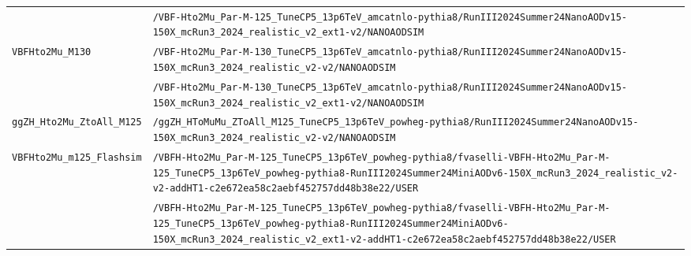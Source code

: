 \begin{longtable}{@{}>{\RaggedRight\arraybackslash}p{} >{\RaggedRight\arraybackslash}p{}@{}}
 & \texttt{/\allowbreak{}VBF-\allowbreak{}Hto2Mu\_\allowbreak{}Par-\allowbreak{}M-\allowbreak{}125\_\allowbreak{}TuneCP5\_\allowbreak{}13p6TeV\_\allowbreak{}amcatnlo-\allowbreak{}pythia8/\allowbreak{}RunIII2024Summer24NanoAODv15-\allowbreak{}150X\_\allowbreak{}mcRun3\_\allowbreak{}2024\_\allowbreak{}realistic\_\allowbreak{}v2\_\allowbreak{}ext1-\allowbreak{}v2/\allowbreak{}NANOAODSIM} \\
\addlinespace[2pt]
\texttt{VBFHto2Mu\_\allowbreak{}M130} & \texttt{/\allowbreak{}VBF-\allowbreak{}Hto2Mu\_\allowbreak{}Par-\allowbreak{}M-\allowbreak{}130\_\allowbreak{}TuneCP5\_\allowbreak{}13p6TeV\_\allowbreak{}amcatnlo-\allowbreak{}pythia8/\allowbreak{}RunIII2024Summer24NanoAODv15-\allowbreak{}150X\_\allowbreak{}mcRun3\_\allowbreak{}2024\_\allowbreak{}realistic\_\allowbreak{}v2-\allowbreak{}v2/\allowbreak{}NANOAODSIM} \\
 & \texttt{/\allowbreak{}VBF-\allowbreak{}Hto2Mu\_\allowbreak{}Par-\allowbreak{}M-\allowbreak{}130\_\allowbreak{}TuneCP5\_\allowbreak{}13p6TeV\_\allowbreak{}amcatnlo-\allowbreak{}pythia8/\allowbreak{}RunIII2024Summer24NanoAODv15-\allowbreak{}150X\_\allowbreak{}mcRun3\_\allowbreak{}2024\_\allowbreak{}realistic\_\allowbreak{}v2\_\allowbreak{}ext1-\allowbreak{}v2/\allowbreak{}NANOAODSIM} \\
\addlinespace[2pt]
\texttt{ggZH\_\allowbreak{}Hto2Mu\_\allowbreak{}ZtoAll\_\allowbreak{}M125} & \texttt{/\allowbreak{}ggZH\_\allowbreak{}HToMuMu\_\allowbreak{}ZToAll\_\allowbreak{}M125\_\allowbreak{}TuneCP5\_\allowbreak{}13p6TeV\_\allowbreak{}powheg-\allowbreak{}pythia8/\allowbreak{}RunIII2024Summer24NanoAODv15-\allowbreak{}150X\_\allowbreak{}mcRun3\_\allowbreak{}2024\_\allowbreak{}realistic\_\allowbreak{}v2-\allowbreak{}v2/\allowbreak{}NANOAODSIM} \\
\addlinespace[2pt]
\texttt{VBFHto2Mu\_\allowbreak{}m125\_\allowbreak{}Flashsim} & \texttt{/\allowbreak{}VBFH-\allowbreak{}Hto2Mu\_\allowbreak{}Par-\allowbreak{}M-\allowbreak{}125\_\allowbreak{}TuneCP5\_\allowbreak{}13p6TeV\_\allowbreak{}powheg-\allowbreak{}pythia8/\allowbreak{}fvaselli-\allowbreak{}VBFH-\allowbreak{}Hto2Mu\_\allowbreak{}Par-\allowbreak{}M-\allowbreak{}125\_\allowbreak{}TuneCP5\_\allowbreak{}13p6TeV\_\allowbreak{}powheg-\allowbreak{}pythia8-\allowbreak{}RunIII2024Summer24MiniAODv6-\allowbreak{}150X\_\allowbreak{}mcRun3\_\allowbreak{}2024\_\allowbreak{}realistic\_\allowbreak{}v2-\allowbreak{}v2-\allowbreak{}addHT1-\allowbreak{}c2e672ea58c2aebf452757dd48b38e22/\allowbreak{}USER} \\
 & \texttt{/\allowbreak{}VBFH-\allowbreak{}Hto2Mu\_\allowbreak{}Par-\allowbreak{}M-\allowbreak{}125\_\allowbreak{}TuneCP5\_\allowbreak{}13p6TeV\_\allowbreak{}powheg-\allowbreak{}pythia8/\allowbreak{}fvaselli-\allowbreak{}VBFH-\allowbreak{}Hto2Mu\_\allowbreak{}Par-\allowbreak{}M-\allowbreak{}125\_\allowbreak{}TuneCP5\_\allowbreak{}13p6TeV\_\allowbreak{}powheg-\allowbreak{}pythia8-\allowbreak{}RunIII2024Summer24MiniAODv6-\allowbreak{}150X\_\allowbreak{}mcRun3\_\allowbreak{}2024\_\allowbreak{}realistic\_\allowbreak{}v2\_\allowbreak{}ext1-\allowbreak{}v2-\allowbreak{}addHT1-\allowbreak{}c2e672ea58c2aebf452757dd48b38e22/\allowbreak{}USER} \\

\end{longtable}
